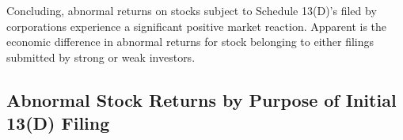 \documentclass[12pt]{article}
\begin{document}
Concluding, abnormal returns on stocks subject to Schedule 13(D)'s filed by corporations experience a significant positive market reaction. Apparent is the economic difference in abnormal returns for stock belonging to either filings submitted by strong or weak investors. 

\pagebreak

\subsection{Abnormal Stock Returns by Purpose of Initial 13(D) Filing}


  

\end{document}
